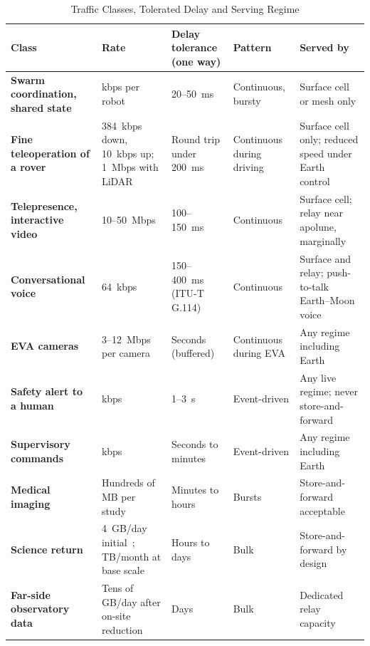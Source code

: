\documentclass{IEEEoj}
\begin{document}
\begin{table}[!t]
\caption{Traffic Classes, Tolerated Delay and Serving Regime}
\label{tab:traffic}
\centering
\footnotesize
\begin{tabularx}{\textwidth}{@{}>{\raggedright\arraybackslash\bfseries}p{3.6cm}>{\raggedright\arraybackslash}p{3.2cm}>{\raggedright\arraybackslash}p{3.0cm}>{\raggedright\arraybackslash}p{2.4cm}>{\raggedright\arraybackslash}X}
\toprule
\rowcolor{tabhead}\textbf{Class} & \textbf{Rate} & \textbf{Delay tolerance (one way)} & \textbf{Pattern} & \textbf{Served by} \\
\midrule
Swarm coordination, shared state & kbps per robot & \SI{20}{}--\SI{50}{ms} & Continuous, bursty & Surface cell or mesh only \\
Fine teleoperation of a rover & \SI{384}{kbps} down, \SI{10}{kbps} up; \SI{1}{Mbps} with LiDAR~\cite{lidar_teleops2012} & Round trip under \SI{200}{ms} & Continuous during driving & Surface cell only; reduced speed under Earth control~\cite{ltv_teleops2025} \\
Telepresence, interactive video & \SI{10}{}--\SI{50}{Mbps} & \SI{100}{}--\SI{150}{ms} & Continuous & Surface cell; relay near apolune, marginally \\
Conversational voice & \SI{64}{kbps} & \SI{150}{}--\SI{400}{ms} (ITU-T G.114) & Continuous & Surface and relay; push-to-talk Earth--Moon voice \\
EVA cameras & \SI{3}{}--\SI{12}{Mbps} per camera~\cite{nokia_lunar_3gpp} & Seconds (buffered) & Continuous during EVA & Any regime including Earth \\
Safety alert to a human & kbps & \SI{1}{}--\SI{3}{\second} & Event-driven & Any live regime; never store-and-forward \\
Supervisory commands & kbps & Seconds to minutes & Event-driven & Any regime including Earth \\
Medical imaging & Hundreds of MB per study & Minutes to hours & Bursts & Store-and-forward acceptable \\
Science return & \SI{4}{GB/day} initial~\cite{nasa_arts_comm}; TB/month at base scale & Hours to days & Bulk & Store-and-forward by design \\
Far-side observatory data & Tens of GB/day after on-site reduction~\cite{burns_farside_2019} & Days & Bulk & Dedicated relay capacity \\
\bottomrule
\end{tabularx}
\end{table}
\end{document}
